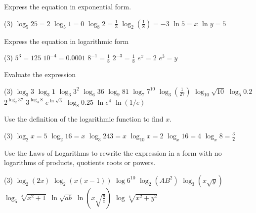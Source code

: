 \begin{Exercise}[title={Logarithmic Functions},label=exLogFunctions]
	\Question Express the equation in exponential form. 
	\begin{tasks}(3)
		\task  $\log _{5} 25 =2$	%
		\task $\log _{5} 1 =0$	%
		\task $\log _{8} 2 =\frac{1}{3}$	%
		\task $\log _{2} \genfrac{(}{)}{}{}{1}{8} = -3$		%
		\task $\ln  5 =x$ 	%
		\task $\ln  y =5$	%
	\end{tasks}

	\Question Express the equation in logarithmic form 
\begin{tasks}(3)
	\task  $5^{3} =125$	%
	\task  $10^{ -4} =0.0001$	%
	\task $8^{ -1} =\frac{1}{8}$	%
	\task 	$2^{ -3} =\frac{1}{8}$	%
	\task $e^{x} =2$	%
	\task $e^{3} =y$	%
\end{tasks}

	
	\Question Evaluate the expression 
	\begin{tasks}(3)
		\task $\log _{3} 3$ %
		\task $\log _{3} 1$	%
		\task $\log _{3} 3^{2}$	%
		\task $\log _{6} 36$	%
		\task $\log _{9} 81$ 	%
		\task $\log _{7} 7^{10}$ 	%
		\task $\log _{3} \genfrac{(}{)}{}{}{1}{27}$ 	%
		\task $\log _{10} \sqrt{10}$ 	%
		\task $\log _{5} 0.2$ 	%
		\task $2^{\log _{2} 37}$ 	%
		\task $3^{\log _{3} 8}$ 	%
		\task $e^{\ln  \sqrt{5}}$	%
		\task $\log _{8} 0.25$ 	%
		\task $\ln  e^{4}$ 	%
		\task $\ln  \left (1/e\right )$ 	%
	\end{tasks}

\Question Use the definition of the logarithmic function to find $x$.
\begin{tasks}(3)
	\task $\log _{2} x =5$ 		%
	\task $\log _{2} 16 =x$ 	%
	\task $\log _{3} 243 =x$ 	%
	\task $\log _{10} x =2$ 	%
	\task $\log _{x} 16 =4$ 	%
	\task $\log _{x} 8 =\frac{3}{2}$ 	%
\end{tasks}
	
\Question Use the Laws of Logarithms to rewrite the expression in a form with no logarithms of products, quotients roots or powers.
\begin{tasks}(3)
	\task $\log _{2} \left (2 x\right )$					%
	\task $\log _{2} \left (x \left (x -1\right )\right )$ 	%
	\task $\log  6^{10}$ 							%
	\task $\log _{2} \left (A B^{2}\right )$		%
	\task $\log _{3} \left (x \sqrt{y}\right )$		%
	\task $\log _{5} \sqrt[{3}]{x^{2} +1}$ 		%
	\task $\ln  \sqrt{a b}$ 						%
	\task $\ln  \left (x \sqrt{\frac{y}{z}}\right )$	%
	\task $\log  \sqrt[{4}]{x^{2} +y^{2}}$		%
\end{tasks}


\end{Exercise}

